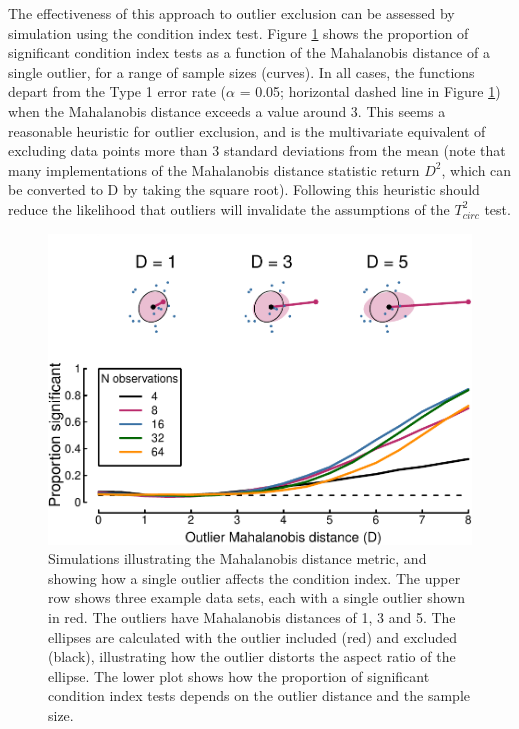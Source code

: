 \documentclass[]{article}
\begin{document}
The effectiveness of this approach to outlier exclusion can be assessed by simulation using the condition index test. Figure \ref{fig:outlierplot} shows the proportion of significant condition index tests as a function of the Mahalanobis distance of a single outlier, for a range of sample sizes (curves). In all cases, the functions depart from the Type 1 error rate (\(\alpha\) = 0.05; horizontal dashed line in Figure \ref{fig:outlierplot}) when the Mahalanobis distance exceeds a value around 3. This seems a reasonable heuristic for outlier exclusion, and is the multivariate equivalent of excluding data points more than 3 standard deviations from the mean (note that many implementations of the Mahalanobis distance statistic return \(D^2\), which can be converted to D by taking the square root). Following this heuristic should reduce the likelihood that outliers will invalidate the assumptions of the \(T^2_{circ}\) test.

\begin{figure}

{\centering \includegraphics{manuscript_files/figure-latex/outlierplot-1} 

}

\caption{Simulations illustrating the Mahalanobis distance metric, and showing how a single outlier affects the condition index. The upper row shows three example data sets, each with a single outlier shown in red. The outliers have Mahalanobis distances of 1, 3 and 5. The ellipses are calculated with the outlier included (red) and excluded (black), illustrating how the outlier distorts the aspect ratio of the ellipse. The lower plot shows how the proportion of significant condition index tests depends on the outlier distance and the sample size.}\label{fig:outlierplot}
\end{figure}
\end{document}
